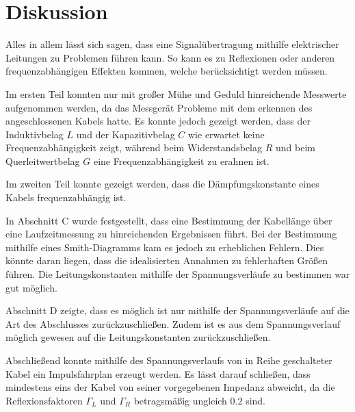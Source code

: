 \FloatBarrier
\section{Diskussion} %
\label{sec:diskussion}

Alles in allem lässt sich sagen, dass eine Signalübertragung mithilfe elektrischer Leitungen zu Problemen führen kann. 
So kann es zu Reflexionen oder anderen frequenzabhängigen Effekten kommen, welche berücksichtigt werden müssen.

Im ersten Teil konnten nur mit großer Mühe und Geduld hinreichende Messwerte aufgenommen werden, da das Messgerät Probleme mit dem erkennen des angeschlossenen Kabels hatte.
Es konnte jedoch gezeigt werden, dass der Induktivbelag $L$ und der Kapazitivbelag $C$ wie erwartet keine Frequenzabhängigkeit zeigt, während beim Widerstandsbelag $R$ und beim Querleitwertbelag $G$ eine Frequenzabhängigkeit zu erahnen ist.

Im zweiten Teil konnte gezeigt werden, dass die Dämpfungskonstante eines Kabels frequenzabhängig ist.

In Abschnitt C wurde festgestellt, dass eine Bestimmung der Kabellänge über eine Laufzeitmessung zu hinreichenden Ergebnissen führt.
Bei der Bestimmung mithilfe eines Smith-Diagramms kam es jedoch zu erheblichen Fehlern.
Dies könnte daran liegen, dass die idealisierten Annahmen zu fehlerhaften Größen führen.
Die Leitungskonstanten mithilfe der Spannungsverläufe zu bestimmen war gut möglich.

Abschnitt D zeigte, dass es möglich ist nur mithilfe der Spannungsverläufe auf die Art des Abschlusses zurückzuschließen.
Zudem ist es aus dem Spannungsverlauf möglich gewesen auf die Leitungskonstanten zurückzuschließen.

Abschließend konnte mithilfe des Spannungsverlaufs von in Reihe geschalteter Kabel ein Impulsfahrplan erzeugt werden.
Es lässt darauf schließen, dass mindestens eins der Kabel von seiner vorgegebenen Impedanz abweicht, da die Reflexionsfaktoren $\Gamma_L$ und $\Gamma_R$ betragsmäßig ungleich $0.2$ sind.

